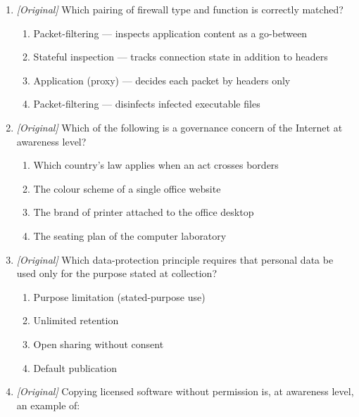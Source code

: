 \begin{enumerate}[label=\textbf{Q\arabic*.}, leftmargin=*]
\begin{enumerate}[label=\Roman*.]
  \end{enumerate}
  \begin{enumerate}[label=\Alph*.]
    \item I only
    \item I and II only
    \item II and III only
    \item I, II, and III
  \end{enumerate}
\item \textit{[Original]} Which pairing of firewall type and function is correctly matched?
  \begin{enumerate}[label=\Alph*.]
    \item Packet-filtering --- inspects application content as a go-between
    \item Stateful inspection --- tracks connection state in addition to headers
    \item Application (proxy) --- decides each packet by headers only
    \item Packet-filtering --- disinfects infected executable files
  \end{enumerate}
\item \textit{[Original]} Which of the following is a governance concern of the Internet at awareness level?
  \begin{enumerate}[label=\Alph*.]
    \item Which country's law applies when an act crosses borders
    \item The colour scheme of a single office website
    \item The brand of printer attached to the office desktop
    \item The seating plan of the computer laboratory
  \end{enumerate}
\item \textit{[Original]} Which data-protection principle requires that personal data be used only for the purpose stated at collection?
  \begin{enumerate}[label=\Alph*.]
    \item Purpose limitation (stated-purpose use)
    \item Unlimited retention
    \item Open sharing without consent
    \item Default publication
  \end{enumerate}
\item \textit{[Original]} Copying licensed software without permission is, at awareness level, an example of:

\end{enumerate}
